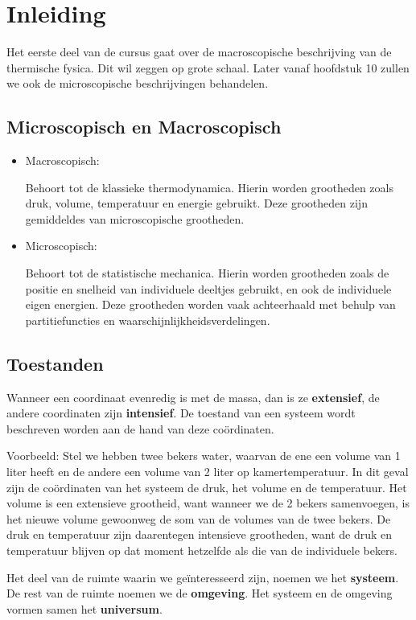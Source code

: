 \section{Inleiding}

Het eerste deel van de cursus gaat over de macroscopische beschrijving van de thermische fysica. Dit wil zeggen op grote schaal. Later vanaf hoofdstuk 10 zullen we ook de microscopische beschrijvingen behandelen.
\subsection{Microscopisch en Macroscopisch}

\begin{itemize}
    \item Macroscopisch: 
    
    Behoort tot de klassieke thermodynamica. Hierin worden grootheden zoals druk, volume, temperatuur en energie gebruikt. Deze grootheden zijn gemiddeldes van microscopische grootheden.
    \item Microscopisch:
    
    Behoort tot de statistische mechanica. Hierin worden grootheden zoals de positie en snelheid van individuele deeltjes gebruikt, en ook de individuele eigen energien. Deze grootheden worden vaak achteerhaald met behulp van partitiefuncties en waarschijnlijkheidsverdelingen. 
\end{itemize}

\subsection{Toestanden}

Wanneer een coordinaat evenredig is met de massa, dan is ze \textbf{extensief}, de andere coordinaten zijn \textbf{intensief}. De toestand van een systeem wordt beschreven worden aan de hand van deze coördinaten.

Voorbeeld: Stel we hebben twee bekers water, waarvan de ene een volume van 1 liter heeft en de andere een volume van 2 liter op kamertemperatuur. In dit geval zijn de coördinaten van het systeem de druk, het volume en de temperatuur. 
Het volume is een extensieve grootheid, want wanneer we de 2 bekers samenvoegen, is het nieuwe volume gewoonweg de som van de volumes van de twee bekers. De druk en temperatuur zijn daarentegen intensieve grootheden, want de druk en temperatuur blijven op dat moment hetzelfde als die van de individuele bekers.

Het deel van de ruimte waarin we geïnteresseerd zijn, noemen we het \textbf{systeem}. De rest van de ruimte noemen we de \textbf{omgeving}. Het systeem en de omgeving vormen samen het \textbf{universum}.

